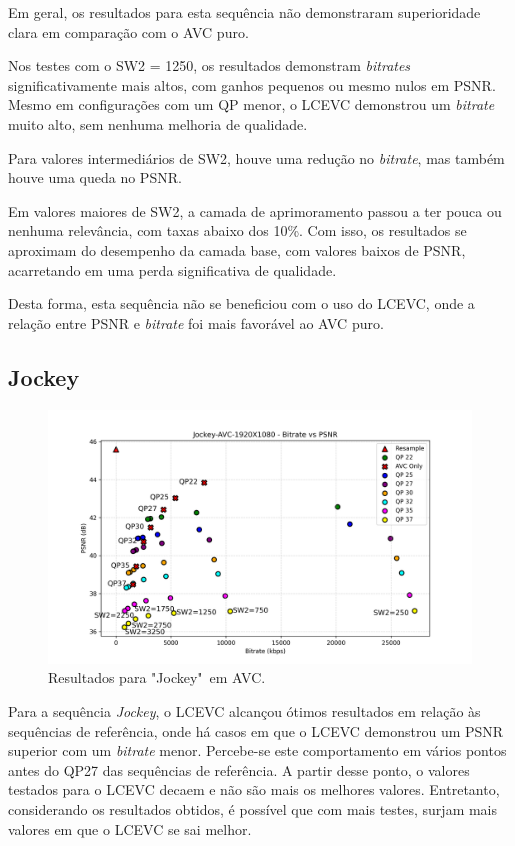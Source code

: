 Em geral, os resultados para esta sequência não demonstraram superioridade clara
em comparação com o \acrshort{AVC} puro.

Nos testes com o SW2 = 1250, os resultados demonstram \textit{bitrates} 
significativamente mais altos, com ganhos pequenos ou mesmo nulos em \acrshort{PSNR}.
Mesmo em configurações com um QP menor, o \acrshort{LCEVC} demonstrou um \textit{bitrate}
muito alto, sem nenhuma melhoria de qualidade.

Para valores intermediários de SW2, houve uma redução no \textit{bitrate}, mas
também houve uma queda no \acrshort{PSNR}.

Em valores maiores de SW2, a camada de aprimoramento passou a ter pouca ou nenhuma
relevância, com taxas abaixo dos 10\%. Com isso, os resultados se aproximam do
desempenho da camada base, com valores baixos de \acrshort{PSNR}, acarretando
em uma perda significativa de qualidade.

Desta forma, esta sequência não se beneficiou com o uso do \acrshort{LCEVC}, onde
a relação entre \acrshort{PSNR} e \textit{bitrate} foi mais favorável ao \acrshort{AVC}
puro.

\newpage
\subsection{Jockey}

\begin{figure}[h!]
    \centering
    \includegraphics[width=1.0\textwidth]{img/Jockey-AVC.png}
    \caption{Resultados para "Jockey"\ em \acrshort{AVC}. \cite{uvg_dataset}}
    \label{fig:Jockey}
\end{figure}

Para a sequência \textit{Jockey}, o \acrshort{LCEVC} alcançou ótimos resultados
em relação às sequências de referência, onde há casos em que o \acrshort{LCEVC}
demonstrou um \acrshort{PSNR} superior com um \textit{bitrate} menor. Percebe-se
este comportamento em vários pontos antes do QP27 das sequências de referência.
A partir desse ponto, o valores testados para o \acrshort{LCEVC} decaem e não
são mais os melhores valores. Entretanto, considerando os resultados obtidos,
é possível que com mais testes, surjam mais valores em que o \acrshort{LCEVC}
se sai melhor.


